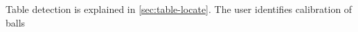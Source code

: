 Table detection is explained in \ref{sec:table-locate}. The user identifies calibration of balls                                                                                                                                                                                                                                                                                                                                                                                                                                                                                                                                                                                                                                                                                                                                                                                                                                                                                                                                                                                                                                                                                                                                                                                                                                                                                                                                                                                                                                                                                                                                                                                                                                                                                                                                                                                                                                                                                                                                                                                                                                                                                                                                                                                                                                                                                                                                                                                                                                                                                                                                                                                                                                                                                                                                                                                                                                                                                                                                                                                                                                                                                                                                                                                                                                                                                                                                                                        